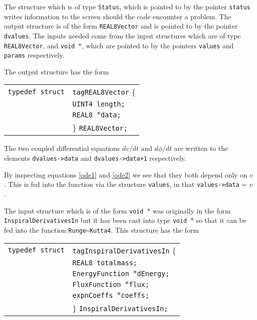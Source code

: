 \documentclass[12pt]{article}
\begin{document}
The structure which is of type \texttt{Status}, which is pointed to by the pointer \texttt{status} writes information to the screen should the code encounter a problem. The output structure is of the form \texttt{REAL8Vector} and is pointed to by the pointer \texttt{dvalues}. 
The inputs needed come from the input structures which are of type \texttt{REAL8Vector}, and \texttt{void $\ast$}, which are pointed to by the pointers \texttt{values} and \texttt{params} respectively.

The output structure has the form

\vspace{5mm}

\begin{tabular}{ll}
\texttt{typedef struct} & \texttt{tagREAL8Vector} \{ \\
                        & \texttt{UINT4 length;} \\
                        & \texttt{REAL8 $\ast$data;}  \\
                        & \} \texttt{REAL8Vector;}
\end{tabular}

\vspace{5mm}

The two coupled differential equations $dv/dt$ and $d\phi/dt$ are written to the elements \texttt{dvalues->data} and \texttt{dvalues->data+1} respectively.

By inspecting equations \ref{ode1} and \ref{ode2} we see that they both depend only on $v$. This is fed into the function via the structure \texttt{values}, in that \texttt{values->data} = $v$.

The input structure which is of the form \texttt{void $\ast$} was originally in the form \texttt{InspiralDerivativesIn} but it has been cast into type \texttt{void $\ast$} so that it can be fed into the function \texttt{Runge--Kutta4}. This structure has the form

\begin{tabular}{ll}
\texttt{typedef struct} & \texttt{tagInspiralDerivativesIn} \{ \\
                        & \texttt{REAL8 totalmass;} \\
                        & \texttt{EnergyFunction $\ast$dEnergy;}  \\
                        & \texttt{FluxFunction $\ast$flux;}  \\
                        & \texttt{expnCoeffs $\ast$coeffs;}  \\
                        & \} \texttt{InspiralDerivativesIn;}
\end{tabular}
\end{document}
